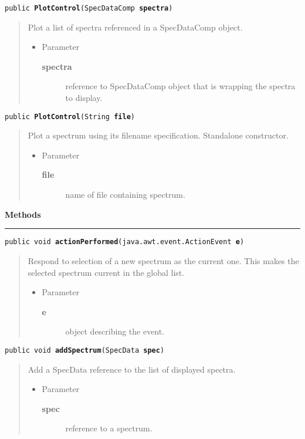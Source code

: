\documentclass[twoside,11pt,nolof]{starlink}
\providecommand{\method}[1]{\texttt{#1}}
\newenvironment{desc}{\begin{quote}}{\end{quote}}
\providecommand{\methods}{
   \par\textbf{\large{Methods}}\\
   \hrule
}
\begin{document}
\method{public \textbf{PlotControl}(\texttt{SpecDataComp} \textbf{spectra})\label{l132}\label{l133}}
\begin{desc}Plot a list of spectra referenced in a SpecDataComp object.
\begin{itemize}
\item{Parameter
  \begin{description}
   \item[\textbf{spectra}]{reference to SpecDataComp object that is
                wrapping the spectra to display.}
  \end{description}}
\end{itemize}
\end{desc}

\method{public \textbf{PlotControl}(\texttt{String} \textbf{file})\label{l134}\label{l135}}
\begin{desc}Plot a spectrum using its filename specification. Standalone
 constructor.
\begin{itemize}
\item{Parameter
  \begin{description}
   \item[\textbf{file}]{name of file containing spectrum.}
  \end{description}}
\end{itemize}
\end{desc}

\methods
\method{public void \textbf{actionPerformed}(\texttt{java.awt.event.ActionEvent} \textbf{e})\label{l136}\label{l137}}
\begin{desc}Respond to selection of a new spectrum as the current one. This
 makes the selected spectrum current in the global list.
\begin{itemize}
\item{Parameter
  \begin{description}
   \item[\textbf{e}]{object describing the event.}
  \end{description}}
\end{itemize}
\end{desc}

\method{public void \textbf{addSpectrum}(\texttt{SpecData} \textbf{spec})\label{l138}\label{l139}}
\begin{desc}Add a SpecData reference to the list of displayed spectra.
\begin{itemize}
\item{Parameter
  \begin{description}
   \item[\textbf{spec}]{reference to a spectrum.}
  \end{description}}
\end{itemize}
\end{desc}
\end{document}
